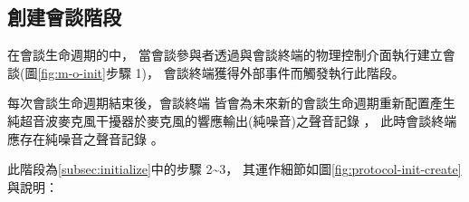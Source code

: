 \subsection{創建會談階段}\label{subsec:protocol-init-create}

    在會談生命週期的中，
當會談參與者透過與會談終端的物理控制介面執行建立會談(圖\ref{fig:m-o-init}步驟 1)，
會談終端獲得外部事件而觸發執行此階段。

    每次會談生命週期結束後，會談終端 \DEFmeetingbox 皆會為未來新的會談生命週期重新配置產生
純超音波麥克風干擾器於麥克風的響應輸出(純噪音)之聲音記錄 \DEFrecN，
此時會談終端 \DEFmeetingbox 應存在純噪音之聲音記錄 \DEFrecN。

    此階段為\ref{subsec:initialize}中的步驟 2\textasciitilde3，
其運作細節如圖\ref{fig:protocol-init-create}與說明：

